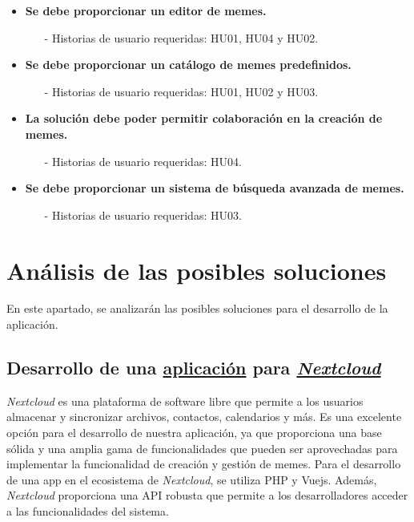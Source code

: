 \begin{itemize}
    \item \textbf{Se debe proporcionar un editor de memes.}
    \begin{itemize}
        \item[-] Historias de usuario requeridas: HU01, HU04 y HU02.
    \end{itemize}
    \item \textbf{Se debe proporcionar un catálogo de memes predefinidos.}
    \begin{itemize}
        \item[-] Historias de usuario requeridas: HU01, HU02 y HU03.
    \end{itemize}
    \item \textbf{La solución debe poder permitir colaboración en la creación de memes.}
    \begin{itemize}
        \item[-] Historias de usuario requeridas: HU04.
    \end{itemize}
    \item \textbf{Se debe proporcionar un sistema de búsqueda avanzada de memes.}
    \begin{itemize}
        \item[-] Historias de usuario requeridas: HU03.
    \end{itemize} 
\end{itemize}

\section{Análisis de las posibles soluciones}

En este apartado, se analizarán las posibles soluciones para el desarrollo de la aplicación.

\subsection{Desarrollo de una \href{https://apps.nextcloud.com/}{aplicación} para \href{https://nextcloud.com/es/}{\textit{Nextcloud}}}

\textit{Nextcloud} es una plataforma de software libre que permite a los usuarios almacenar y sincronizar archivos, contactos, calendarios y más. Es una excelente opción para el desarrollo de nuestra aplicación, ya que proporciona una base sólida y una amplia gama de funcionalidades que pueden ser aprovechadas para implementar la funcionalidad de creación y gestión de memes. Para el desarrollo de una app en el ecosistema de \textit{Nextcloud}, se utiliza PHP y Vuejs. Además, \textit{Nextcloud} proporciona una API robusta que permite a los desarrolladores acceder a las funcionalidades del sistema.

